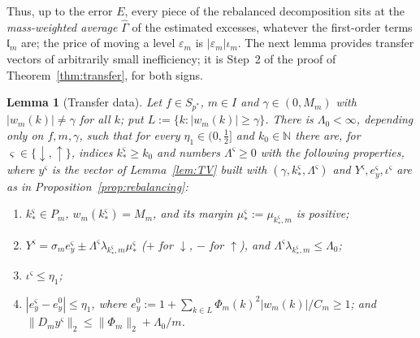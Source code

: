 \documentclass[10pt]{amsart}
\newtheorem{lemma}[theorem]{Lemma}
\theoremstyle{definition}
\theoremstyle{remark}
\newcommand{\N}{\mathbb N}
\newcommand{\lin}{\mathfrak l}
\begin{document}
Thus, up to the error $E$, every piece of the rebalanced decomposition sits
at the \emph{mass-weighted average} $\hat\Gamma$ of the estimated excesses,
whatever the first-order terms $\lin_m$ are; the price of moving a level
$\varepsilon_m$ is $|\varepsilon_m|\iota_m$.  The next lemma provides
transfer vectors of arbitrarily small inefficiency; it is
Step~2 of the proof of Theorem~\ref{thm:transfer}, for both signs.

\begin{lemma}[Transfer data]\label{lem:transferdata}
Let $f\in S_{p^*}$, $m\in I$ and $\gamma\in(0,M_m)$ with $|w_m(k)|\ne\gamma$
for all $k$; put $L:=\{k:|w_m(k)|\ge\gamma\}$.  There is $\Lambda_0<\infty$,
depending only on $f,m,\gamma$, such that for every $\eta_1\in(0,\frac12]$
and $k_0\in\N$ there are, for $\varsigma\in\{\downarrow,\uparrow\}$,
indices $k_*^\varsigma\ge k_0$ and numbers $\Lambda^\varsigma\ge0$ with the
following properties, where $y^\varsigma$ is the vector of
Lemma~\ref{lem:TV} built with $(\gamma,k_*^\varsigma,\Lambda^\varsigma)$ and
$Y^\varsigma,e^\varsigma_y,\iota^\varsigma$ are as in
Proposition~\ref{prop:rebalancing}:
\begin{enumerate}
\item[(a)] $k_*^\varsigma\in P_m$, $w_m(k_*^\varsigma)=M_m$, and its margin
$\mu^\varsigma_*:=\mu_{k_*^\varsigma,m}$ is positive;
\item[(b)] $Y^\varsigma=\sigma_me^\varsigma_y\pm\Lambda^\varsigma
\lambda_{k_*^\varsigma,m}\mu^\varsigma_*$ \textup{(}$+$ for $\downarrow$, $-$
for $\uparrow$\textup{)}, and $\Lambda^\varsigma\lambda_{k^\varsigma_*,m}\le
\Lambda_0$;
\item[(c)] $\iota^\varsigma\le\eta_1$;
\item[(d)] $|e^\varsigma_y-e^0_y|\le\eta_1$, where
$e^0_y:=1+\sum_{k\in L}\Phi_m(k)^2|w_m(k)|/C_m\ge1$; and
$\|D_my^\varsigma\|_2\le\|\Phi_m\|_2+\Lambda_0/m$.
\end{enumerate}
\end{lemma}
\end{document}
